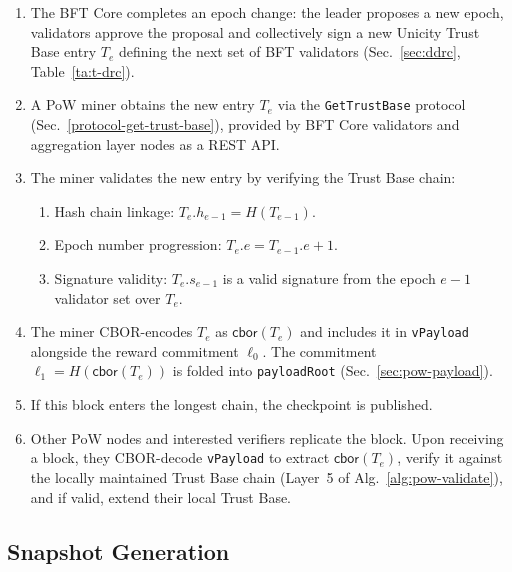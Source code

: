 \begin{enumerate}
  \item The BFT Core completes an epoch change: the leader proposes a new epoch, validators approve the proposal and collectively sign a new Unicity Trust Base entry $T_e$ defining the next set of BFT validators (Sec.~\ref{sec:ddrc}, Table~\ref{ta:t-drc}).
  \item A PoW miner obtains the new entry $T_e$ via the \texttt{GetTrustBase} protocol (Sec.~\ref{protocol-get-trust-base}), provided by BFT Core validators and aggregation layer nodes as a REST API.
  \item The miner validates the new entry by verifying the Trust Base chain:
    \begin{enumerate}[nosep]
      \item Hash chain linkage: $T_e.h_{e-1} = H(T_{e-1})$.
      \item Epoch number progression: $T_e.e = T_{e-1}.e + 1$.
      \item Signature validity: $T_e.s_{e-1}$ is a valid signature from the epoch $e-1$ validator set over $T_e$.
    \end{enumerate}
  \item The miner CBOR-encodes $T_e$ as $\mathsf{cbor}(T_e)$ and includes it in \texttt{vPayload} alongside the reward commitment $\ell_0$. The commitment $\ell_1 = H(\mathsf{cbor}(T_e))$ is folded into \texttt{payloadRoot} (Sec.~\ref{sec:pow-payload}).
  \item If this block enters the longest chain, the checkpoint is published.
  \item Other PoW nodes and interested verifiers replicate the block. Upon receiving a block, they CBOR-decode \texttt{vPayload} to extract $\mathsf{cbor}(T_e)$, verify it against the locally maintained Trust Base chain (Layer~5 of Alg.~\ref{alg:pow-validate}), and if valid, extend their local Trust Base.
\end{enumerate}


\subsection{Snapshot Generation}\label{sec:snapshot-generation}

